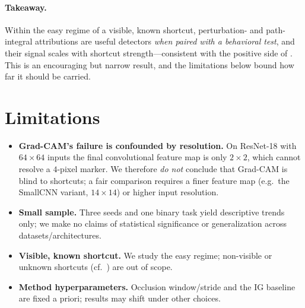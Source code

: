 \documentclass[11pt]{article}
\begin{document}
\paragraph{Takeaway.} Within the easy regime of a visible, known shortcut, perturbation- and
path-integral attributions are useful detectors \emph{when paired with a behavioral test}, and their
signal scales with shortcut strength---consistent with the positive side of
\citet{adebayo2020debugging}. This is an encouraging but narrow result, and the limitations below
bound how far it should be carried.

\section{Limitations}
\label{sec:limitations}
\begin{itemize}
  \item \textbf{Grad-CAM's failure is confounded by resolution.} On ResNet-18 with $64\times64$
  inputs the final convolutional feature map is only $2\times2$, which cannot resolve a $4$-pixel
  marker. We therefore \emph{do not} conclude that Grad-CAM is blind to shortcuts; a fair comparison
  requires a finer feature map (e.g.\ the SmallCNN variant, $14\times14$) or higher input resolution.
  \item \textbf{Small sample.} Three seeds and one binary task yield descriptive trends only; we make
  no claims of statistical significance or generalization across datasets/architectures.
  \item \textbf{Visible, known shortcut.} We study the easy regime; non-visible or unknown shortcuts
  (cf.\ \citet{adebayo2022posthoc}) are out of scope.
  \item \textbf{Method hyperparameters.} Occlusion window/stride and the IG baseline are fixed a
  priori; results may shift under other choices.
\end{itemize}

\end{document}
